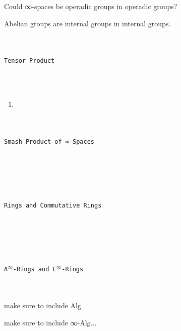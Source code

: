 \documentclass{book}
\theoremstyle{definition}
\renewcommand{\chapter}[1]{
\newpage
{
\Huge 
\begin{center}
\ \\
\ \\
\thispagestyle{empty}
\texttt{#1}
\end{center}}
\ \\
\ \\
}
\begin{document}
Could ∞-spaces be operadic groups in operadic groups?

Abelian groups are internal groups in internal groups.



\newpage
\chapter{Tensor Product}

\begin{enumerate}
\item 
\end{enumerate}


\newpage
\chapter{Smash Product of ∞-Spaces}

\newpage
\chapter{Rings and Commutative Rings}




\newpage
\chapter{A${}^{\infty}$-Rings and E${}^{\infty}$-Rings}

make sure to include Alg

make sure to include ∞-Alg...

\end{document}
